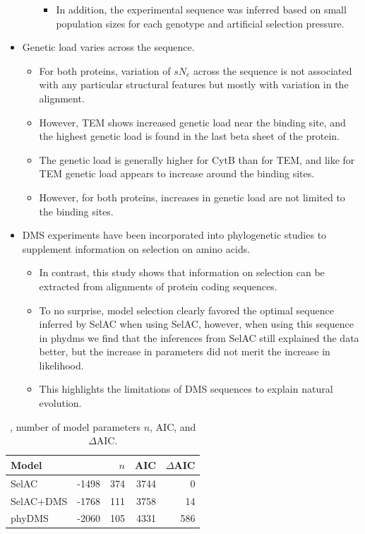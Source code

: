 \documentclass[12pt]{article}
\begin{document}
\begin{itemize}
\begin{itemize}
\begin{itemize}
			\item In addition, the experimental sequence was inferred based on small population sizes for each genotype and artificial selection pressure. 
		\end{itemize}
	\end{itemize}
	\item Genetic load varies across the sequence.
	\begin{itemize}
		\item For both proteins, variation of $sN_e$ across the sequence is not associated with any particular structural features but mostly with variation in the alignment.
		\item However, TEM shows increased genetic load near the binding site, and the highest genetic load is found in the last beta sheet of the protein.
		\item The genetic load is generally higher for CytB than for TEM, and like for TEM genetic load appears to increase around the binding sites.
		\item However, for both proteins, increases in genetic load are not limited to the binding sites.
	\end{itemize}
	\item DMS experiments have been incorporated into phylogenetic studies to supplement information on selection on amino acids.
	\begin{itemize}
		\item In contrast, this study shows that information on selection can be extracted from alignments of protein coding sequences.
		\item To no surprise, model selection clearly favored the optimal sequence inferred by SelAC when using SelAC, however, when using this sequence in phydms we find that the inferences from SelAC still explained the data better, but the increase in parameters did not merit the increase in likelihood.
		\item This highlights the limitations of DMS sequences to explain natural evolution.
	\end{itemize}
\end{itemize}

\begin{table}
  \centering
  \begin{tabular}{lrrrr}
    Model	& \LLik &$n$ & AIC & $\Delta$AIC\\ \hline 
    SelAC	& -1498 & 374& 3744&  0\\
    SelAC+DMS 	& -1768 & 111& 3758& 14\\
    phyDMS 	& -2060 & 105& 4331& 586\\

  \end{tabular}
  \caption{\LLik, number of model parameters $n$, AIC, and $\Delta$AIC.}
  \label{tab:AIC}
\end{table}
\end{document}
